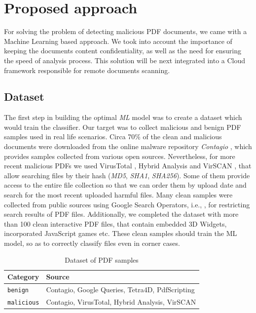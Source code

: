 \chapter{Proposed approach}
\label{chapter:proposedApproach}

For solving the problem of detecting malicious PDF documents, we came with a Machine Learning based approach. We took into account the importance of keeping the documents content confidentiality, as well as the need for ensuring the speed of analysis process. This solution will be next integrated into a Cloud framework responsible for remote documents scanning.

\section{Dataset}
\label{section:dataset}
The first step in building the optimal \textit{ML} model was to create a dataset which would train the classifier. Our target was to collect malicious and benign PDF samples used in real life scenarios. Circa 70\% of the clean and malicious documents were downloaded from the online malware repository \textit{Contagio} \cite{contagio}, which provides samples collected from various open sources. Nevertheless, for more recent malicious PDFs we used VirusTotal \cite{virustotal}, Hybrid Analysis \cite{hybridanalysis} and VirSCAN \cite{virscan}, that allow searching files by their hash (\textit{MD5}, \textit{SHA1}, \textit{SHA256}). Some of them provide access to the entire file collection so that we can order them by upload date and search for the most recent uploaded harmful files. Many clean samples were collected from public sources using Google Search Operators, i.e., , for restricting search results of PDF files. Additionally, we completed the dataset with more than 100 clean interactive PDF files, that contain embedded 3D Widgets, incorporated JavaScript games etc. These clean samples should train the ML model, so as to correctly classify files even in corner cases. 

\begin{table}[H]
	\caption{Dataset of PDF samples}
	\label{table:pdfSamples}
        \centering
            \begin{tabular}{p{2.5cm} p{9.5cm}}
                \toprule
                
				\textbf{Category} & \textbf{Source} \\
				\hline 
                \texttt{benign} & Contagio, Google Queries, Tetra4D, PdfScripting \\
                \hline
				\texttt{malicious} & Contagio, VirusTotal, Hybrid Analysis, VirSCAN \\
                
                \bottomrule
			\end{tabular}
\end{table}

